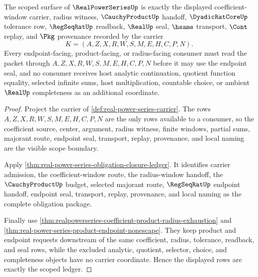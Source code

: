 
\begin{theorem}
\label{thm:realpowerseries-scoped-radius-ledger}
The scoped surface of $\RealPowerSeriesUp$ is exactly the displayed coefficient-window carrier, radius witness, $\CauchyProductUp$ handoff, $\DyadicRatCoreUp$ tolerance row, $\RegSeqRatUp$ readback, $\RealUp$ seal, $\hsame$ transport, $\Cont$ replay, and $\Pkg$ provenance recorded by the carrier
$$
K=(A,Z,X,R,W,S,M,E,H,C,P,N).
$$
Every endpoint-facing, product-facing, or radius-facing consumer must read the packet through $A,Z,X,R,W,S,M,E,H,C,P,N$ before it may use the endpoint seal, and no consumer receives host analytic continuation, quotient function equality, selected infinite sums, host multiplication, countable choice, or ambient $\RealUp$ completeness as an additional coordinate.
\end{theorem}
\begin{proof}
Project the carrier of \autoref{def:real-power-series-carrier}. The rows $A,Z,X,R,W,S,M,E,H,C,P,N$ are the only rows available to a consumer, so the coefficient source, center, argument, radius witness, finite windows, partial sums, majorant route, endpoint seal, transport, replay, provenance, and local naming are the visible scope boundary.

Apply \autoref{thm:real-power-series-obligation-closure-ledger}. It identifies carrier admission, the coefficient-window route, the radius-window handoff, the $\CauchyProductUp$ budget, selected majorant route, $\RegSeqRatUp$ endpoint handoff, endpoint seal, transport, replay, provenance, and local naming as the complete obligation package.

Finally use \autoref{thm:realpowerseries-coefficient-product-radius-exhaustion} and \autoref{thm:real-power-series-product-endpoint-nonescape}. They keep product and endpoint requests downstream of the same coefficient, radius, tolerance, readback, and seal rows, while the excluded analytic, quotient, selector, choice, and completeness objects have no carrier coordinate. Hence the displayed rows are exactly the scoped ledger.
\end{proof}

